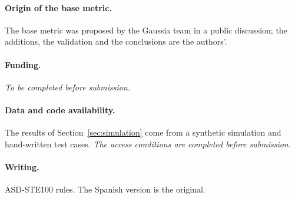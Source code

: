\documentclass[11pt,a4paper]{article}
\begin{document}
\paragraph{Origin of the base metric.} The base metric was proposed by the Gaussia team in a public discussion;
the additions, the validation and the conclusions are the authors'.

\paragraph{Funding.} \textit{To be completed before submission.}

\paragraph{Data and code availability.} The results of Section~\ref{sec:simulation} come from a synthetic
simulation and hand-written test cases. \textit{The access conditions are completed before submission.}

\paragraph{Writing.} ASD-STE100 rules. The Spanish version is the original.



\end{document}
